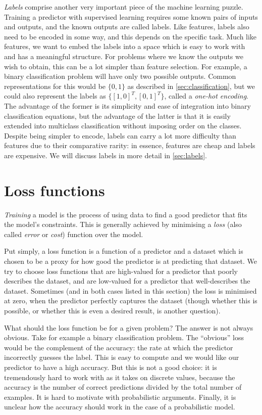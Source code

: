 \documentclass[11pt, a4paper]{book}
\newcommand{\defn}[1]{\emph{#1}}
\begin{document}
    \defn{Labels} comprise another very important piece of the machine learning puzzle. Training a predictor with supervised learning requires some known pairs of inputs and outputs, and the known outputs are called labels. Like features, labels also need to be encoded in some way, and this depends on the specific task. Much like features, we want to embed the labels into a space which is easy to work with and has a meaningful structure. For problems where we know the outputs we wish to obtain, this can be a lot simpler than feature selection. For example, a binary classification problem will have only two possible outputs. Common representations for this would be $\{0, 1\}$ as described in \autoref{sec:classification}, but we could also represent the labels as $\{[1, 0]^T, [0, 1]^T\}$, called a \defn{one-hot encoding}. The advantage of the former is its simplicity and ease of integration into binary classification equations, but the advantage of the latter is that it is easily extended into multiclass classification without imposing order on the classes. Despite being simpler to encode, labels can carry a lot more difficulty than features due to their comparative rarity: in essence, features are cheap and labels are expensive. We will discuss labels in more detail in \autoref{sec:labels}.

\section{Loss functions}
\label{sec:training}

    \defn{Training} a model is the process of using data to find a good predictor that fits the model's constraints. This is generally achieved by minimising a \defn{loss} (also called \defn{error} or \defn{cost}) function over the model.

    Put simply, a loss function is a function of a predictor and a dataset which is chosen to be a proxy for how good the predictor is at predicting that dataset. We try to choose loss functions that are high-valued for a predictor that poorly describes the dataset, and are low-valued for a predictor that well-describes the dataset. Sometimes (and in both cases listed in this section) the loss is minimised at zero, when the predictor perfectly captures the dataset (though whether this is possible, or whether this is even a desired result, is another question).

    What should the loss function be for a given problem? The answer is not always obvious. Take for example a binary classification problem. The ``obvious'' loss would be the complement of the accuracy: the rate at which the predictor incorrectly guesses the label. This is easy to compute and we would like our predictor to have a high accuracy. But this is not a good choice: it is tremendously hard to work with as it takes on discrete values, because the accuracy is the number of correct predictions divided by the total number of examples. It is hard to motivate with probabilistic arguments. Finally, it is unclear how the accuracy should work in the case of a probabilistic model.
\end{document}
